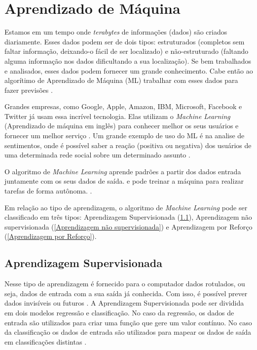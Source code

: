 \section{Aprendizado de Máquina}
\label{sec:aprendizado de máquina}

Estamos em um tempo onde \textit{terabytes} de informações (dados) são criados diariamente. Esses dados podem ser de dois tipos: estruturados (completos sem faltar informação, deixando-o fácil de ser localizado) e não-estruturado (faltando alguma informação nos dados dificultando a sua localização). Se bem trabalhados e analisados, esses dados podem fornecer um grande conhecimento. Cabe então ao algorítimo de Aprendizado de Máquina (ML) trabalhar com esses dados para fazer previsões \cite{pythonmachinelearning}. 

Grandes empresas, como Google, Apple, Amazon, IBM, Microsoft, Facebook e Twitter já usam essa incrível tecnologia. Elas utilizam o \textit{Machine Learning} (Aprendizado de máquina em inglês) para conhecer melhor os seus usuários e fornecer um melhor serviço \cite{pythonmachinelearning}. Um grande exemplo de uso do ML é na analise de sentimentos, onde é possível saber a reação (positiva ou negativa) dos usuários de uma determinada rede social sobre um determinado assunto \cite{sentimentos}.

O algoritmo de \textit{Machine Learning} aprende padrões a partir dos dados entrada juntamente com os seus dados de saída. e pode treinar a máquina para realizar tarefas de forma autônoma. \cite{diferencamachinelearning}.

Em relação ao tipo de aprendizagem, o algoritmo de \textit{Machine Learning} pode ser classificado em três tipos: Aprendizagem Supervisionada (\ref{aprendizadagem supervisionada}), Aprendizagem não supervisionada (\ref{Aprendizagem não supervisionada}) e Aprendizagem por Reforço (\ref{Aprendizagem por Reforço}).

\subsection{Aprendizagem Supervisionada}
\label{aprendizadagem supervisionada}
Nesse tipo de aprendizagem é fornecido para o computador dados rotulados, ou seja, dados de entrada com a sua saída já conhecida. Com isso, é possível prever dados invisíveis ou futuros \cite{pythonmachinelearning}. 
A Aprendizagem Supervisionada pode ser dividida em dois modelos regressão e classificação. No caso da regressão, os dados de entrada são utilizados para criar uma função que gere um valor contínuo. No caso da classificação os dados de entrada são utilizados para mapear os dados de saída em classificações distintas \cite{pythonmachinelearning}. 

